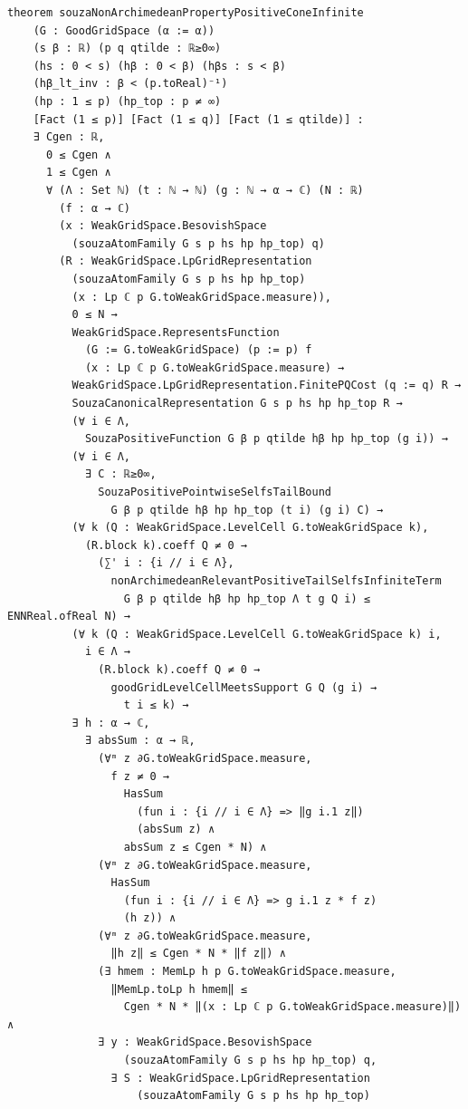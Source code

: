 \documentclass[11pt]{amsart}
\theoremstyle{definition}
\begin{document}
\begin{lstlisting}[style=lean,basicstyle=\ttfamily\scriptsize]
theorem souzaNonArchimedeanPropertyPositiveConeInfinite
    (G : GoodGridSpace (α := α))
    (s β : ℝ) (p q qtilde : ℝ≥0∞)
    (hs : 0 < s) (hβ : 0 < β) (hβs : s < β)
    (hβ_lt_inv : β < (p.toReal)⁻¹)
    (hp : 1 ≤ p) (hp_top : p ≠ ∞)
    [Fact (1 ≤ p)] [Fact (1 ≤ q)] [Fact (1 ≤ qtilde)] :
    ∃ Cgen : ℝ,
      0 ≤ Cgen ∧
      1 ≤ Cgen ∧
      ∀ (Λ : Set ℕ) (t : ℕ → ℕ) (g : ℕ → α → ℂ) (N : ℝ)
        (f : α → ℂ)
        (x : WeakGridSpace.BesovishSpace
          (souzaAtomFamily G s p hs hp hp_top) q)
        (R : WeakGridSpace.LpGridRepresentation
          (souzaAtomFamily G s p hs hp hp_top)
          (x : Lp ℂ p G.toWeakGridSpace.measure)),
          0 ≤ N →
          WeakGridSpace.RepresentsFunction
            (G := G.toWeakGridSpace) (p := p) f
            (x : Lp ℂ p G.toWeakGridSpace.measure) →
          WeakGridSpace.LpGridRepresentation.FinitePQCost (q := q) R →
          SouzaCanonicalRepresentation G s p hs hp hp_top R →
          (∀ i ∈ Λ,
            SouzaPositiveFunction G β p qtilde hβ hp hp_top (g i)) →
          (∀ i ∈ Λ,
            ∃ C : ℝ≥0∞,
              SouzaPositivePointwiseSelfsTailBound
                G β p qtilde hβ hp hp_top (t i) (g i) C) →
          (∀ k (Q : WeakGridSpace.LevelCell G.toWeakGridSpace k),
            (R.block k).coeff Q ≠ 0 →
              (∑' i : {i // i ∈ Λ},
                nonArchimedeanRelevantPositiveTailSelfsInfiniteTerm
                  G β p qtilde hβ hp hp_top Λ t g Q i) ≤ ENNReal.ofReal N) →
          (∀ k (Q : WeakGridSpace.LevelCell G.toWeakGridSpace k) i,
            i ∈ Λ →
              (R.block k).coeff Q ≠ 0 →
                goodGridLevelCellMeetsSupport G Q (g i) →
                  t i ≤ k) →
          ∃ h : α → ℂ,
            ∃ absSum : α → ℝ,
              (∀ᵐ z ∂G.toWeakGridSpace.measure,
                f z ≠ 0 →
                  HasSum
                    (fun i : {i // i ∈ Λ} => ‖g i.1 z‖)
                    (absSum z) ∧
                  absSum z ≤ Cgen * N) ∧
              (∀ᵐ z ∂G.toWeakGridSpace.measure,
                HasSum
                  (fun i : {i // i ∈ Λ} => g i.1 z * f z)
                  (h z)) ∧
              (∀ᵐ z ∂G.toWeakGridSpace.measure,
                ‖h z‖ ≤ Cgen * N * ‖f z‖) ∧
              (∃ hmem : MemLp h p G.toWeakGridSpace.measure,
                ‖MemLp.toLp h hmem‖ ≤
                  Cgen * N * ‖(x : Lp ℂ p G.toWeakGridSpace.measure)‖) ∧
              ∃ y : WeakGridSpace.BesovishSpace
                  (souzaAtomFamily G s p hs hp hp_top) q,
                ∃ S : WeakGridSpace.LpGridRepresentation
                    (souzaAtomFamily G s p hs hp hp_top)

\end{lstlisting}
\end{document}
